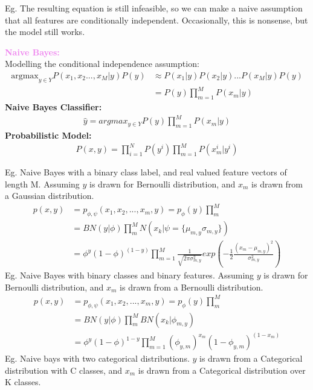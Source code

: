 \documentclass[a4paper,10pt]{article}
\begin{document}
\noindent Eg. The resulting equation is still infeasible, so we can make a naive assumption that all features are conditionally independent. Occasionally, this is nonsense, but the model still works. 
\begin{shaded}
	\noindent \textcolor{Violet}{\textbf{Naive Bayes:}}\\
	Modelling the conditional independence assumption:
	\begin{align*}
		\text{argmax}_{y \in Y}P(x_{1}, x_{2} ..., x_{M}|y)P(y) &\approx P(x_{1}|y)P(x_{2}|y)...P(x_{M}|y)P(y) \\
		&= P(y) \prod_{m=1}^{M}P(x_{m}|y)
	\end{align*}
	\textbf{Naive Bayes Classifier:}
	\begin{align*}
		\hat{y} = argmax_{y \in Y} P(y)\prod_{m=1}^{M}P(x_{m}|y)
	\end{align*}
	\textbf{Probabilistic Model:}
	\begin{align*}
		P(x,y) = \prod_{i=1}^{N}P(y^{i})\prod_{m=1}^{M}P(x_{m}^{i}|y^{i})
	\end{align*}
\end{shaded}
\noindent Eg. Naive Bayes with a binary class label, and real valued feature vectors of length M. Assuming $y$ is drawn for Bernoulli distribution, and $x_m$ is drawn from a Gaussian distribution. 
\begin{align*}
	p(x,y) &= p_{\phi, \psi}(x_{1}, x_{2}, ..., x_{m}, y) = p_{\phi}(y)\prod_{m}^{M} \\
	&= BN(y|\phi)\prod_{m}^{M}N(x_{k}|\psi = \{\mu_{m,y} \sigma_{m,y}\}) \\
	&= \phi^{y}(1-\phi)^{(1-y)}\prod_{m=1}^{M}\frac{1}{\sqrt{2\pi\sigma_{m,y}^{2}}}exp(-\frac{1}{2}\frac{(x_{m} - \mu_{m,y})^{2}}{\sigma_{m,y}^{2}})
\end{align*}
Eg. Naive Bayes with binary classes and binary features. Assuming $y$ is drawn for Bernoulli distribution, and $x_m$ is drawn from a Bernoulli distribution.
\begin{align*}
		p(x,y) &= p_{\phi, \psi}(x_{1}, x_{2}, ..., x_{m}, y) = p_{\phi}(y)\prod_{m}^{M} \\
	&= BN(y|\phi)\prod_{m}^{M}BN(x_{k}|\phi_{m,y}) \\
	&= \phi^{y}(1-\phi)^{1-y}\prod_{m=1}^{M}(\phi_{y,m})^{x_{m}}(1-\phi_{y,m})^{(1-x_{m})}
\end{align*}
Eg. Naive bays with two categorical distributions. $y$ is drawn from a Categorical distribution with C classes, and $x_{m}$ is drawn from a Categorical distribution over K classes. 
\end{document}
